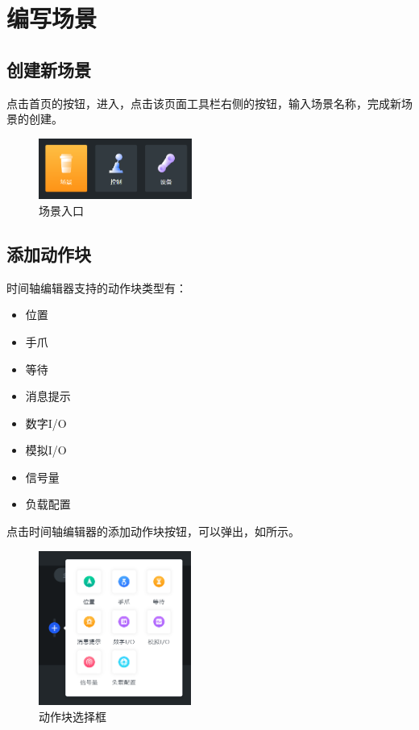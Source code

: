 

\vfill

\clearpage

\section{编写场景}
\subsection{创建新场景}
点击\LM 首页的按钮，进入，点击该页面工具栏右侧的按钮，输入场景名称，完成新场景的创建。

\begin{figure}[ht]
	\centering
	\includegraphics[height=2cm]{screen/3-4.png}
	\caption{场景入口}
	\label{fig:场景入口}
\end{figure}

\subsection{添加动作块}

时间轴编辑器支持的动作块类型有：
\begin{itemize}
\item 位置
\item 手爪
\item 等待
\item 消息提示
\item 数字I/O
\item 模拟I/O
\item 信号量
\item 负载配置
\end{itemize}

点击时间轴编辑器的添加动作块按钮，可以弹出，如所示。

\begin{figure}[ht]
	\centering
	\includegraphics[width=5cm]{screen/3-5.png}
	\caption{动作块选择框}
	\label{fig:添加动作块弹出框}
\end{figure}

